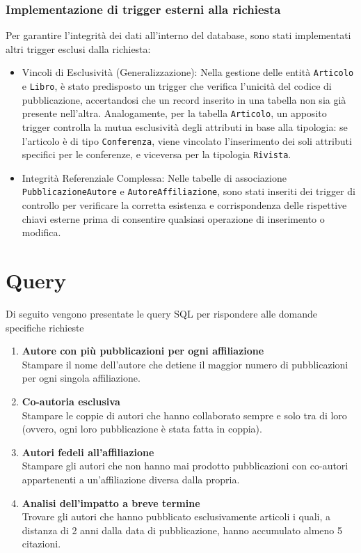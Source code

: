 \documentclass[a4paper,12pt]{article}
\begin{document}
\subsubsection{Implementazione di trigger esterni alla richiesta}
Per garantire l'integrità dei dati all'interno del database, sono stati implementati altri trigger esclusi dalla richiesta:
\begin{itemize}
    \item Vincoli di Esclusività (Generalizzazione): Nella gestione delle entità \texttt{Articolo} e \texttt{Libro}, è stato predisposto un trigger che verifica l'unicità del codice di pubblicazione, accertandosi che un record inserito in una tabella non sia già presente nell'altra. Analogamente, per la tabella \texttt{Articolo}, un apposito trigger controlla la mutua esclusività degli attributi in base alla tipologia: se l'articolo è di tipo \texttt{Conferenza}, viene vincolato l'inserimento dei soli attributi specifici per le conferenze, e viceversa per la tipologia \texttt{Rivista}.
    \item Integrità Referenziale Complessa: Nelle tabelle di associazione \texttt{PubblicazioneAutore} e \texttt{AutoreAffiliazione}, sono stati inseriti dei trigger di controllo per verificare la corretta esistenza e corrispondenza delle rispettive chiavi esterne prima di consentire qualsiasi operazione di inserimento o modifica.
\end{itemize}
\section{Query} \label{sec:query}
Di seguito vengono presentate le query SQL per rispondere alle domande specifiche richieste
\begin{enumerate}[label=\textbf{Q\arabic*}, start=1, leftmargin=1.5cm]
    \item \textbf{Autore con più pubblicazioni per ogni affiliazione} \\
    Stampare il nome dell'autore che detiene il maggior numero di pubblicazioni per ogni singola affiliazione.
    
    \item \textbf{Co-autoria esclusiva} \\
    Stampare le coppie di autori che hanno collaborato sempre e solo tra di loro (ovvero, ogni loro pubblicazione è stata fatta in coppia).
    
    \item \textbf{Autori fedeli all'affiliazione} \\
    Stampare gli autori che non hanno mai prodotto pubblicazioni con co-autori appartenenti a un'affiliazione diversa dalla propria.
    
    \item \textbf{Analisi dell'impatto a breve termine} \\
    Trovare gli autori che hanno pubblicato esclusivamente articoli i quali, a distanza di 2 anni dalla data di pubblicazione, hanno accumulato almeno 5 citazioni.
\end{enumerate}
\end{document}
